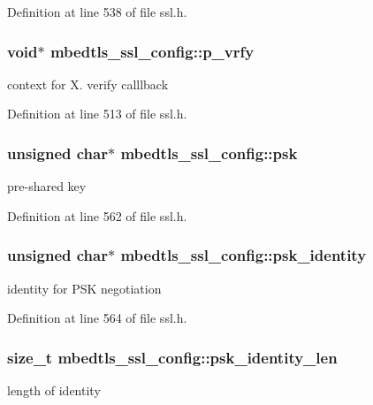 Definition at line 538 of file ssl.\-h.

\hypertarget{structmbedtls__ssl__config_ac59c71efac4d612c645e703941efae51}{
\subsubsection[{p\-\_\-vrfy}]{\setlength{\rightskip}{0pt plus 5cm}void$\ast$ mbedtls\-\_\-ssl\-\_\-config\-::p\-\_\-vrfy}}\label{structmbedtls__ssl__config_ac59c71efac4d612c645e703941efae51}
context for X. verify calllback 

Definition at line 513 of file ssl.\-h.

\hypertarget{structmbedtls__ssl__config_a70636b4747d4b82e28c76c740e891ab3}{
\subsubsection[{psk}]{\setlength{\rightskip}{0pt plus 5cm}unsigned char$\ast$ mbedtls\-\_\-ssl\-\_\-config\-::psk}}\label{structmbedtls__ssl__config_a70636b4747d4b82e28c76c740e891ab3}
pre-\/shared key 

Definition at line 562 of file ssl.\-h.

\hypertarget{structmbedtls__ssl__config_a3ed897b829686c76876d5f2bbb43d641}{
\subsubsection[{psk\-\_\-identity}]{\setlength{\rightskip}{0pt plus 5cm}unsigned char$\ast$ mbedtls\-\_\-ssl\-\_\-config\-::psk\-\_\-identity}}\label{structmbedtls__ssl__config_a3ed897b829686c76876d5f2bbb43d641}
identity for P\-S\-K negotiation 

Definition at line 564 of file ssl.\-h.

\hypertarget{structmbedtls__ssl__config_a095fcfcae220215168448335c3294f6c}{
\subsubsection[{psk\-\_\-identity\-\_\-len}]{\setlength{\rightskip}{0pt plus 5cm}size\-\_\-t mbedtls\-\_\-ssl\-\_\-config\-::psk\-\_\-identity\-\_\-len}}\label{structmbedtls__ssl__config_a095fcfcae220215168448335c3294f6c}
length of identity 

